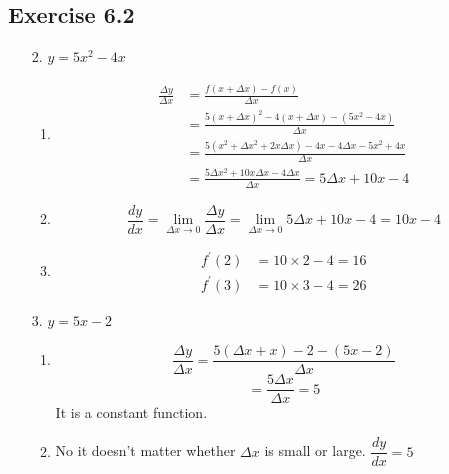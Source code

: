 \documentclass{./../../Latex/homework}
\begin{document}
\thispagestyle{plain}

\subsection*{Exercise 6.2} 
\begin{enumerate}

\item[2.] $y=5 x^{2}-4 x$

\begin{enumerate}
\item
$$
\begin{aligned}
\frac{\Delta y}{\Delta x} &=\frac{f(x+\Delta x)-f(x)}{\Delta x} \\
&=\frac{5(x+\Delta x)^{2}-4(x+\Delta x)-\left(5 x^{2}-4 x\right)}{\Delta x} \\
&=\frac{5\left(x^{2}+\Delta x^{2}+2 x \Delta x\right)-4 x-4 \Delta x-5 x^{2}+4 x}{\Delta x} \\
&=\frac{5 \Delta x^{2}+10 x \Delta x-4 \Delta x}{\Delta x}=5 \Delta x+10 x-4
\end{aligned}
$$
\item $$\frac{d y}{d x}=\lim _{\Delta x \rightarrow 0} \frac{\Delta y}{\Delta x}=\lim _{\Delta x \rightarrow 0} 5 \Delta x+10 x-4=10 x-4$$ 

\item $$\begin{aligned} f^{\prime}(2) &=10 \times 2-4=16 \\ f^{\prime}(3) &=10 \times 3-4=26 \end{aligned}$$ 
\end{enumerate}

\item[3.] $y=5 x-2$ \\
\begin{enumerate}
\item $$\frac{\Delta y}{\Delta x}=\frac{5(\Delta x+x)-2-(5 x-2)}{\Delta x}$$
$$
=\frac{5 \Delta x}{\Delta x}=5
$$
It is a constant function. 

\item No it doesn't matter whether $\Delta x$ is small or large. $\dfrac{d y}{d x}=5$
\end{enumerate}

\end{enumerate}

\end{document}
